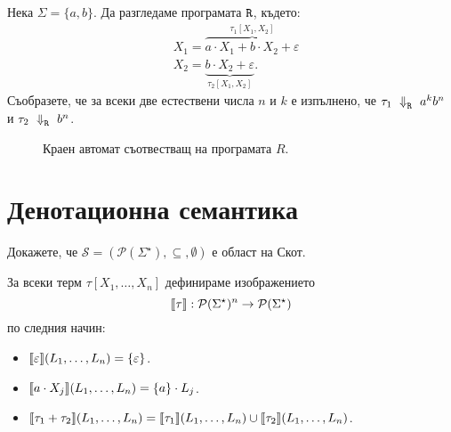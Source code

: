 \begin{example}
  Нека $\Sigma = \{a,b\}$. Да разгледаме програмата $\texttt{R}$, където:
  \begin{align*}
    & X_1 = \overbrace{a \cdot X_1 + b \cdot X_2 + \varepsilon}^{\tau_1[X_1,X_2]}\\
    & X_2 = \underbrace{b \cdot X_2 + \varepsilon}_{\tau_2[X_1,X_2]}.    
  \end{align*}
  Съобразете, че за всеки две естествени числа $n$ и $k$ е изпълнено, че $\tau_1~\Downarrow^{}_{\texttt{R}}~a^k b^n$ и $\tau_2~\Downarrow^{}_{\texttt{R}}~b^n$.
  \begin{figure}[H]
      \centering
      \caption{Краен автомат съотвестващ на програмата $R$.}
    \end{figure}
\end{example}

\section{Денотационна семантика}
\label{reg:sect:denotational-semantics}


\begin{problem}
  Докажете, че $\mathcal{S} = (\mathcal{P}(\Sigma^\star), \subseteq, \emptyset)$ е област на Скот.
\end{problem}

За всеки терм $\tau[X_1,\dots,X_n]$ дефинираме изображението
\[\llbracket{\tau}\rrbracket: \mathcal{P}(\Sigma^\star)^n \to \mathcal{P}(\Sigma^\star)\]
 по следния начин:
\begin{itemize}
\item 
  $\llbracket{\varepsilon}\rrbracket(L_1,\dots,L_n) = \{\varepsilon\}$.
\item 
  $\llbracket{a \cdot X_j}\rrbracket(L_1,\dots,L_n) = \{a\} \cdot L_j$.
\item
  $\llbracket{\tau_1 + \tau_2}\rrbracket(L_1,\dots,L_n) = \llbracket{\tau_1}\rrbracket(L_1,\dots,L_n) \cup \llbracket{\tau_2}\rrbracket(L_1,\dots,L_n)$.
\end{itemize}

